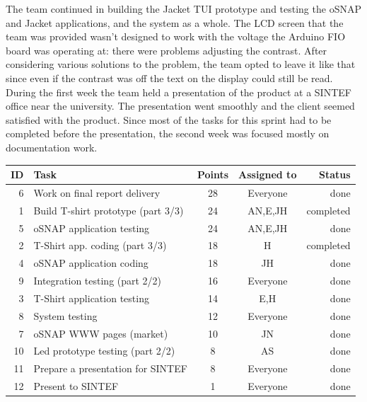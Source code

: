 The team continued in building the Jacket TUI prototype and testing
the oSNAP and Jacket applications, and the system as a whole.
The LCD screen that the team was provided wasn't designed to work with the
voltage the Arduino FIO board was operating at: there were problems adjusting
the contrast. After considering various solutions to the problem, the team
opted to leave it like that since even if the contrast was off the text on the
display could still be read. During the first week the team held a presentation
of the product at a SINTEF office near the university. The presentation went
smoothly and the client seemed satisfied with the product. Since most of the
tasks for this sprint had to be completed before the presentation, the second
week was focused mostly on documentation work.


\begin{table}[ht!]
\begin{tabular}{ | r | l | c | c | r | }

\hline
\textbf{ID} & \textbf{Task} & \textbf{Points} & \textbf{Assigned to} & \textbf{Status} \\
\hline

 6 & Work on final report delivery				& 28 & Everyone	& done \\
\hline
 1 & Build T-shirt prototype (part 3/3)			& 24 & AN,E,JH	& completed \\
\hline
 5 & oSNAP application testing					& 24 & AN,E,JH	& done \\
\hline
 2 & T-Shirt app. coding (part 3/3)				& 18 & H		& completed \\
\hline
 4 & oSNAP application coding					& 18 & JH		& done \\
\hline
 9 & Integration testing (part 2/2)				& 16 & Everyone	& done \\
\hline
 3 & T-Shirt application testing 				& 14 & E,H		& done \\
\hline
 8 & System testing								& 12 & Everyone	& done \\
\hline
 7 & oSNAP WWW pages (market)					& 10 & JN		& done \\
\hline
10 & Led prototype testing (part 2/2)			& 8  & AS		& done \\
\hline
11 & Prepare a presentation for SINTEF & 8  & Everyone       & done \\
\hline
12 & Present to SINTEF & 1  & Everyone       & done \\
\hline

\end{tabular}
\end{table}

